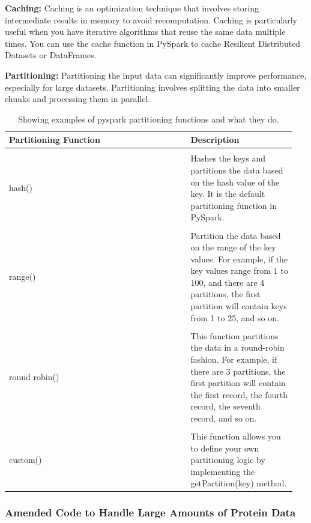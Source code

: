 \documentclass[]{final_report}
\begin{document}
\textbf{Caching:} Caching is an optimization technique that involves storing intermediate results in memory to avoid recomputation. Caching is particularly useful when you have iterative algorithms that reuse the same data multiple times. You can use the cache function in PySpark to cache Resilient Distributed Datasets or DataFrames.

\textbf{Partitioning:} Partitioning the input data can significantly improve performance, especially for large datasets. Partitioning involves splitting the data into smaller chunks and processing them in parallel.

\clearpage

\begin{table}[ht!]
    \begin{center}
        \label{tab:partitioning}
        \begin{tabular}{p{0.6\linewidth}|p{0.35\linewidth}}
            Partitioning Function & Description\\
            \hline
            \\
            hash() & Hashes the keys and partitions the data based on the hash value of the key. It is the default partitioning function in PySpark.
            \\
            \hline
            \\
            range() & Partition the data based on the range of the key values. For example, if the key values range from 1 to 100, and there are 4 partitions, the first partition will contain keys from 1 to 25, and so on.
            \\
            \hline
            \\
            round robin() & This function partitions the data in a round-robin fashion. For example, if there are 3 partitions, the first partition will contain the first record, the fourth record, the seventh record, and so on.
            \\
            \hline
            \\
            custom() & This function allows you to define your own partitioning logic by implementing the getPartition(key) method.
        \end{tabular}
        \caption{\label{partitioning}Showing examples of pyspark partitioning functions and what they do.}
    \end{center}
\end{table}

\subsubsection{Amended Code to Handle Large Amounts of Protein Data}
\end{document}
